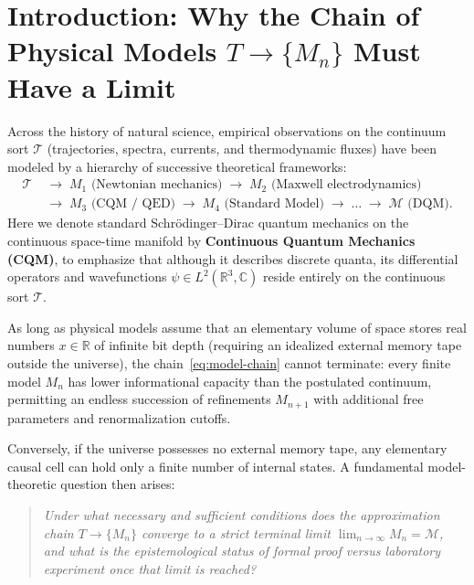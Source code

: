 \documentclass[11pt,a4paper]{article}
\theoremstyle{definition}
\theoremstyle{remark}
\begin{document}
\section{Introduction: Why the Chain of Physical Models $T \to \{M_n\}$ Must Have a Limit}
\label{sec:intro}

Across the history of natural science, empirical observations on the continuum sort $\mathcal{T}$ (trajectories, spectra, currents, and thermodynamic fluxes) have been modeled by a hierarchy of successive theoretical frameworks:
\begin{equation}
  \label{eq:model-chain}
  \begin{aligned}
    \mathcal{T} &\;\longrightarrow\; M_1 \text{ (Newtonian mechanics)} \;\longrightarrow\; M_2 \text{ (Maxwell electrodynamics)} \\
    &\;\longrightarrow\; M_3 \text{ (CQM / QED)} \;\longrightarrow\; M_4 \text{ (Standard Model)} \;\longrightarrow\; \dots \;\longrightarrow\; \mathcal{M} \text{ (DQM)}.
  \end{aligned}
\end{equation}
Here we denote standard Schrödinger--Dirac quantum mechanics on the continuous space-time manifold by \textbf{Continuous Quantum Mechanics (CQM)}, to emphasize that although it describes discrete quanta, its differential operators and wavefunctions $\psi\in L^2(\mathbb{R}^3,\mathbb{C})$ reside entirely on the continuous sort $\mathcal{T}$.

As long as physical models assume that an elementary volume of space stores real numbers $x\in\mathbb{R}$ of infinite bit depth (requiring an idealized external memory tape outside the universe), the chain~\eqref{eq:model-chain} cannot terminate: every finite model $M_n$ has lower informational capacity than the postulated continuum, permitting an endless succession of refinements $M_{n+1}$ with additional free parameters and renormalization cutoffs.

Conversely, if the universe possesses no external memory tape, any elementary causal cell can hold only a finite number of internal states. A fundamental model-theoretic question then arises:
\begin{quote}
  \emph{Under what necessary and sufficient conditions does the approximation chain $T \to \{M_n\}$ converge to a strict terminal limit $\lim_{n\to\infty} M_n = \mathcal{M}$, and what is the epistemological status of formal proof versus laboratory experiment once that limit is reached?}
\end{quote}
\end{document}
